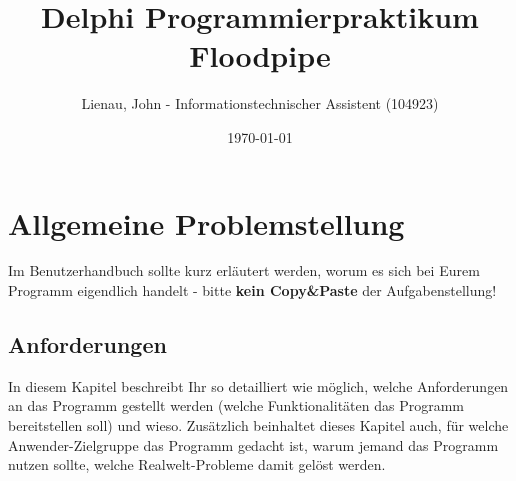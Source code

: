 \documentclass[12pt, letterpaper, twoside]{article}
\begin{document}

    \title{Delphi Programmierpraktikum Floodpipe}
    \author{Lienau, John - Informationstechnischer Assistent (104923)}
    \date{\today}
    \maketitle
    \newpage

    \tableofcontents
    \newpage


    \section{Allgemeine Problemstellung}
        Im Benutzerhandbuch sollte kurz erläutert werden, worum es sich bei Eurem Programm eigendlich handelt
        - bitte \textbf{kein Copy\&Paste} der Aufgabenstellung!

        \subsection{Anforderungen}
            In diesem Kapitel beschreibt Ihr so detailliert wie möglich, welche Anforderungen an das Programm gestellt werden
            (welche Funktionalitäten das Programm bereitstellen soll) und wieso.
            Zusätzlich beinhaltet dieses Kapitel auch, für welche Anwender-Zielgruppe das Programm gedacht ist,
            warum jemand das Programm nutzen sollte, welche Realwelt-Probleme damit gelöst werden.
\end{document}
